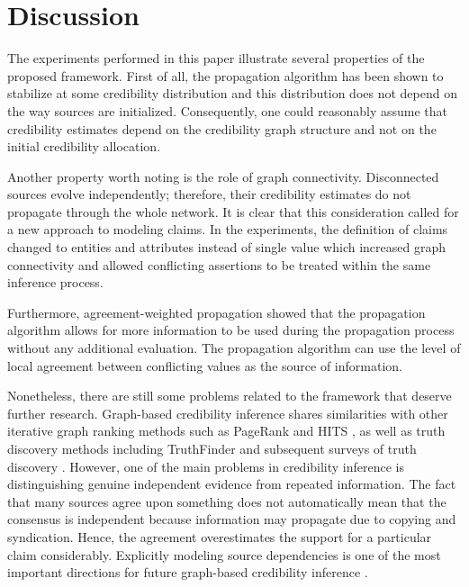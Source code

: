 \section{Discussion}

The experiments performed in this paper illustrate several properties of the proposed framework. First of all, the propagation algorithm has been shown to stabilize at some credibility distribution and this distribution does not depend on the way sources are initialized. Consequently, one could reasonably assume that credibility estimates depend on the credibility graph structure and not on the initial credibility allocation.

Another property worth noting is the role of graph connectivity. Disconnected sources evolve independently; therefore, their credibility estimates do not propagate through the whole network. It is clear that this consideration called for a new approach to modeling claims. In the experiments, the definition of claims changed to entities and attributes instead of single value which increased graph connectivity and allowed conflicting assertions to be treated within the same inference process.

Furthermore, agreement-weighted propagation showed that the propagation algorithm allows for more information to be used during the propagation process without any additional evaluation. The propagation algorithm can use the level of local agreement between conflicting values as the source of information.

Nonetheless, there are still some problems related to the framework that deserve further research. Graph-based credibility inference shares similarities with other iterative graph ranking methods such as PageRank \cite{brin1998anatomy} and HITS \cite{kleinberg1999authoritative}, as well as truth discovery methods including TruthFinder \cite{yin2008truthfinder} and subsequent surveys of truth discovery \cite{li2016survey}. However, one of the main problems in credibility inference is distinguishing genuine independent evidence from repeated information. The fact that many sources agree upon something does not automatically mean that the consensus is independent because information may propagate due to copying and syndication. Hence, the agreement overestimates the support for a particular claim considerably. Explicitly modeling source dependencies is one of the most important directions for future graph-based credibility inference \cite{dong2009integrating}.